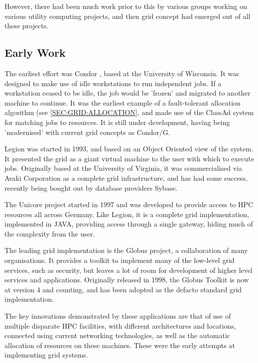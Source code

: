 However, there had been much work prior to this by various groups working on
various utility computing projects, and then grid concept had emerged out of
all these projects.

\subsection{Early Work}

The earliest effort was Condor\cite{grid-basney99-condor} , based at the
University of Wisconsin.  It was designed to make use of idle workstations to
run independent jobs. If a workstation ceased to be idle, the job would be
'frozen' and migrated to another machine to continue.  It was the earliest
example of a fault-tolerant allocation algorithm (see
\ref{SEC:GRID:ALLOCATION}, and made use of the
ClassAd\cite{grid-raman98-classad} system for matching jobs to resources. It is
still under development, having being 'modernised' with current grid concepts
as Condor/G\cite{grid-frey01-condor-g}.

Legion\cite{grid-chapin99-legion} was started in 1993, and based on an Object
Oriented view of the system. It presented the grid as a giant virtual machine
to the user with which to execute jobs. Originally based at the University of
Virginia, it was commercialised via Avaki Corporation as a complete grid
infrastructure, and has had some success, recently being bought out by database
providers Sybase.

The Unicore\cite{grid-romberg99-unicore} project started in 1997 and was
developed to provide access to HPC resources all across Germany. Like Legion,
it is a complete grid implementation, implemented in JAVA, providing access
through a single gateway, hiding much of the complexity from the user. 

The leading grid implementation is the Globus\cite{grid-globus-www} project, a
collaboration of many organisations. It provides a toolkit to implement many of
the low-level grid services, such as security, but leaves a lot of room for
development of higher level services and applications. Originally released in
1998\cite{grid-foster98-globus}, the Globus Toolkit\cite{grid-foster06-toolkit}
is now at version 4 and counting, and has been adopted as the defacto standard
grid implementation.

The key innovations demonstrated by these applications are that of use of
multiple disparate HPC facilities, with different architectures and locations,
connected using current networking technologies, as well as the automatic
allocation of resources on these machines. These were the early attempts at
implementing grid systems.

